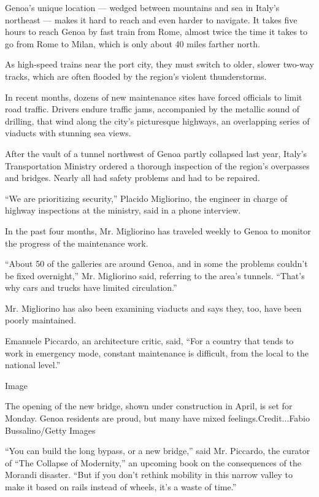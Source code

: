 Genoa's unique location --- wedged between mountains and sea in Italy's
northeast --- makes it hard to reach and even harder to navigate. It
takes five hours to reach Genoa by fast train from Rome, almost twice
the time it takes to go from Rome to Milan, which is only about 40 miles
farther north.

As high-speed trains near the port city, they must switch to older,
slower two-way tracks, which are often flooded by the region's violent
thunderstorms.

In recent months, dozens of new maintenance sites have forced officials
to limit road traffic. Drivers endure traffic jams, accompanied by the
metallic sound of drilling, that wind along the city's picturesque
highways, an overlapping series of viaducts with stunning sea views.

After the vault of a tunnel northwest of Genoa partly collapsed last
year, Italy's Transportation Ministry ordered a thorough inspection of
the region's overpasses and bridges. Nearly all had safety problems and
had to be repaired.

``We are prioritizing security,'' Placido Migliorino, the engineer in
charge of highway inspections at the ministry, said in a phone
interview.

In the past four months, Mr. Migliorino has traveled weekly to Genoa to
monitor the progress of the maintenance work.

``About 50 of the galleries are around Genoa, and in some the problems
couldn't be fixed overnight,'' Mr. Migliorino said, referring to the
area's tunnels. ``That's why cars and trucks have limited circulation.''

Mr. Migliorino has also been examining viaducts and says they, too, have
been poorly maintained.

Emanuele Piccardo, an architecture critic, said, ``For a country that
tends to work in emergency mode, constant maintenance is difficult, from
the local to the national level.''

Image

The opening of the new bridge, shown under construction in April, is set
for Monday. Genoa residents are proud, but many have mixed
feelings.Credit...Fabio Bussalino/Getty Images

``You can build the long bypass, or a new bridge,'' said Mr. Piccardo,
the curator of ``The Collapse of Modernity,'' an upcoming book on the
consequences of the Morandi disaster. ``But if you don't rethink
mobility in this narrow valley to make it based on rails instead of
wheels, it's a waste of time.''

